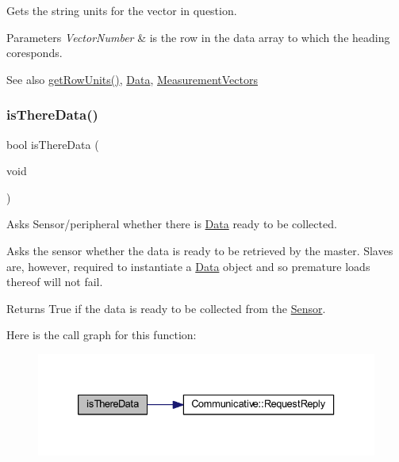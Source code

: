 Gets the string units for the vector in question. 


\begin{DoxyParams}{Parameters}
{\em Vector\+Number} & is the row in the data array to which the heading coresponds. \\
\hline
\end{DoxyParams}
\begin{DoxySeeAlso}{See also}
\mbox{\hyperlink{class_data_source_abf7e2f4954b1c314fba8f0ac3194306e}{get\+Row\+Units()}}, \mbox{\hyperlink{struct_data}{Data}}, \mbox{\hyperlink{_s_p_i___instruction_set_8h_a9d8048399836e11887f85cc8dc3d75d5}{Measurement\+Vectors}} 
\end{DoxySeeAlso}
\mbox{\label{class_data_source_a7d92295e088894b5417729a814e49e01}} 
\subsubsection{\texorpdfstring{isThereData()}{isThereData()}}
{\footnotesize\ttfamily bool is\+There\+Data (\begin{DoxyParamCaption}\item[{void}]{ }\end{DoxyParamCaption})}



Asks Sensor/peripheral whether there is \mbox{\hyperlink{struct_data}{Data}} ready to be collected. 

Asks the sensor whether the data is ready to be retrieved by the master. Slave\textquotesingle{}s are, however, required to instantiate a \mbox{\hyperlink{struct_data}{Data}} object and so premature loads thereof will not fail. \begin{DoxyReturn}{Returns}
True if the data is ready to be collected from the \mbox{\hyperlink{class_sensor}{Sensor}}. 
\end{DoxyReturn}
Here is the call graph for this function\+:
\nopagebreak
\begin{figure}[H]
\begin{center}
\leavevmode
\includegraphics[width=333pt]{class_data_source_a7d92295e088894b5417729a814e49e01_cgraph}
\end{center}
\end{figure}
\mbox{\label{class_data_source_a81aac807bfb601c2ac1da78f69d31d48}} 
